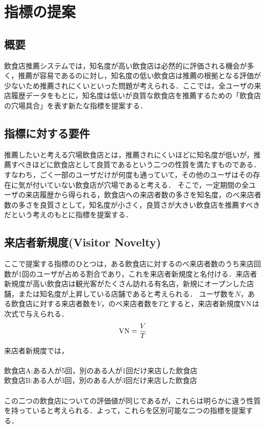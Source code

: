\chapter{指標の提案}
\label{chap:proposal}

\section{概要}

飲食店推薦システムでは，知名度が高い飲食店は必然的に評価される機会が多く，推薦が容易であるのに対し，知名度の低い飲食店は推薦の根拠となる評価が少ないため推薦されにくいといった問題が考えられる．ここでは，全ユーザの来店履歴データをもとに，知名度は低いが良質な飲食店を推薦するための「飲食店の穴場具合」を表す新たな指標を提案する．

\section{指標に対する要件}

推薦したいと考える穴場飲食店とは，推薦されにくいほどに知名度が低いが，推薦すべきほどに飲食店として良質であるという二つの性質を満たすものである．
すなわち，ごく一部のユーザだけが何度も通っていて，その他のユーザはその存在に気が付いていない飲食店が穴場であると考える．
そこで，一定期間の全ユーザの来店履歴から得られる，飲食店への来店者数の多さを知名度，のべ来店者数の多さを良質さとして，知名度が小さく，良質さが大きい飲食店を推薦すべきだという考えのもとに指標を提案する．

\section{来店者新規度(Visitor Novelty)}

ここで提案する指標のひとつは，ある飲食店に対するのべ来店者数のうち来店回数が1回のユーザが占める割合であり，これを来店者新規度と名付ける．来店者新規度が高い飲食店は観光客がたくさん訪れる有名店，新規にオープンした店舗，または知名度が上昇している店舗であると考えられる．
ユーザ数を$N$，ある飲食店に対する来店者数を$V$，のべ来店者数を$T$とすると，来店者新規度$\rm VN$は次式で与えられる．
\begin{equation}
	{\rm VN} = \frac{V}{T}
\end{equation}

来店者新規度では，\\\\
飲食店A:ある人が5回，別のある人が1回だけ来店した飲食店\\
飲食店B:ある人が3回，別のある人が3回だけ来店した飲食店\\\\
この二つの飲食店についての評価値が同じであるが，これらは明らかに違う性質を持っていると考えられる．よって，これらを区別可能な二つの指標を提案する．

